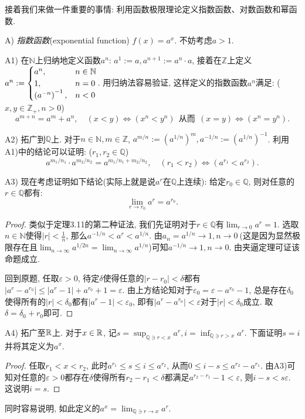 接着我们来做一件重要的事情: 利用函数极限理论定义指数函数、对数函数和幂函数. 

A) \textit{指数函数}(exponential function) $f(x)=a^x$. 不妨考虑$a>1$. 

A1) 在$\mathbb{N}$上归纳地定义函数$a^n$: $a^1:=a, a^{n+1}:=a^n \cdot a$, 接着在$\mathbb{Z}$上定义$a^n:=\begin{cases}
	a^n, &n\in \mathbb{N} \\ 1, &n=0 \\ \left( a^{-n} \right)^{-1}, &n<0
\end{cases}$. 用归纳法容易验证, 这样定义的指数函数$a^n$满足: ($x,y \in \mathbb{Z}_+,n>0$)$$a^{m+n}=a^m+a^n,\quad (x<y) \Leftrightarrow (x^n<y^n)  ~~\textit{从而} ~~ (x=y) \Leftrightarrow (x^n=y^n).$$

A2) 拓广到$\mathbb{Q}$上. 对于$n\in \mathbb{N},m\in \mathbb{Z}$, $a^{m/n}:= (a^{1/n})^m, a^{-1/n}:=(a^{1/n})^{-1}$. 利用A1)中的结论可以证明: ($r_1,r_2 \in \mathbb{Q}$) $$a^{m_1/n_1} \cdot a^{m_2/n_2} = a^{m_1/n_1+m_2/n_2},\quad (r_1<r_2) \Leftrightarrow (a^{r_1} < a^{r_2}).$$

A3) 现在考虑证明如下结论(实际上就是说$a^r$在$\mathbb{Q}$上连续): 给定$r_0 \in \mathbb{Q}$, 则对任意的$r \in \mathbb{Q}$都有: $$\lim_{r \to r_0} a^r = a^{r_0}.$$
\begin{proof}
	类似于定理3.11的第二种证法, 我们先证明对于$r \in \mathbb{Q}$有$\lim_{r\to 0} a^r = 1$. 选取$n \in \mathbb{N}$使得$|r|<\frac{1}{n}$, 那么$a^{-1/n} < a^r < a^{1/n}$. 由$a_n = a^{1/n} \to 1, n\to 0~$(这是因为显然极限存在且$\lim_{n\to \infty} a^{1/2n} = \lim_{n\to \infty} a^{1/n}$)可知$a^{-1/n} \to 1, n\to 0$. 由夹逼定理可证该命题成立. 
	
	回到原题, 任取$\varepsilon >0$, 待定$\delta$使得任意的$|r-r_0|<\delta$都有$|a^r-a^{r_0}|\leq |a^r-1|+a^{r_0}+1=\varepsilon$. 由上方结论知对于$\varepsilon _0 = \varepsilon - a^{r_0} -1$, 总是存在$\delta _0$使得所有的$|r|<\delta _0$都有$|a^r-1|<\varepsilon _0$, 即有$|a^r-a^{r_0}|<\varepsilon$对于$|r|<\delta _0$成立. 取$\delta = \delta _0+r_0$即可. 
\end{proof}

A4) 拓广至$\mathbb{R}$上. 对于$x \in \mathbb{R}$, 记$\displaystyle  s=\sup_{\mathbb{Q} \ni r < x} a^r, i=\inf_{\mathbb{Q} \ni r > x} a^r$. 下面证明$s=i$并将其定义为$a^x$. 

\begin{proof}
	任取$r_1<x<r_2$, 此时$a^{r_1} \leq s \leq i \leq a^{r_2}$, 从而$0\leq i-s \leq a^{r_2}-a^{r_1}$. 由A3)可知对任意的$\varepsilon >0$都存在$\delta$使得所有$r_2-r_1<\delta$都满足$a^{r_2-r_1} - 1<\varepsilon$, 则$i-s < s\varepsilon$. 这说明$i=s$. 
\end{proof}
同时容易说明, 如此定义的$a^x = \lim_{\mathbb{Q} \ni r \to x} a^r$. 

